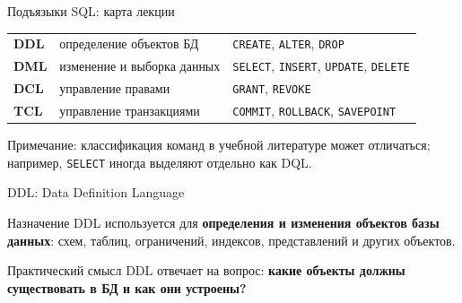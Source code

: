 \documentclass[aspectratio=169]{beamer}
\begin{document}
\begin{frame}{Подъязыки SQL: карта лекции}
\begin{center}
\end{center}

\vspace{0.45cm}
\small
\begin{tabular}{p{}|p{}|p{}}
\toprule
\textbf{DDL} & определение объектов БД & \texttt{CREATE}, \texttt{ALTER}, \texttt{DROP}\\
\textbf{DML} & изменение и выборка данных & \texttt{SELECT}, \texttt{INSERT}, \texttt{UPDATE}, \texttt{DELETE}\\
\textbf{DCL} & управление правами & \texttt{GRANT}, \texttt{REVOKE}\\
\textbf{TCL} & управление транзакциями & \texttt{COMMIT}, \texttt{ROLLBACK}, \texttt{SAVEPOINT}\\
\bottomrule
\end{tabular}

\vspace{0.2cm}
\footnotesize
Примечание: классификация команд в учебной литературе может отличаться; например,
\texttt{SELECT} иногда выделяют отдельно как DQL.
\end{frame}

\begin{frame}{DDL: Data Definition Language}
\begin{block}{Назначение}
DDL используется для \textbf{определения и изменения объектов базы данных}:
схем, таблиц, ограничений, индексов, представлений и других объектов.
\end{block}

\vspace{0.3cm}
\begin{center}
\end{center}

\begin{alertblock}{Практический смысл}
DDL отвечает на вопрос: \textbf{какие объекты должны существовать в БД и как они устроены?}
\end{alertblock}
\end{frame}
\end{document}
